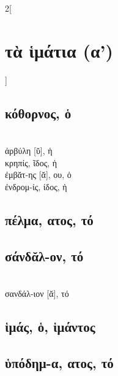 \documentclass{book}
\begin{document}
\begin{multicols}{2}[\section{τὰ ἱμάτια (α')}]
\subsection{κόθορνος, ὁ}               ~\\
ἀρβύλη [ῠ], ἡ  ~\\
κρηπίς, ῖδος, ἡ  ~\\
ἐμβᾰτ-ης [ᾰ], ου, ὁ  ~\\
ἐνδρομ-ίς, ίδος, ἡ 
\subsection{πέλμα, ατος, τό}         
\subsection{σάνδᾰλ-ον, τό}              ~\\
σανδάλ-ιον [ᾰ], τό 
\subsection{ἱμάς, ὁ, ἱμάντος}  
\subsection{ὑπόδημ-α, ατος, τό}
~
\end{multicols}
\newpage
\end{document}
